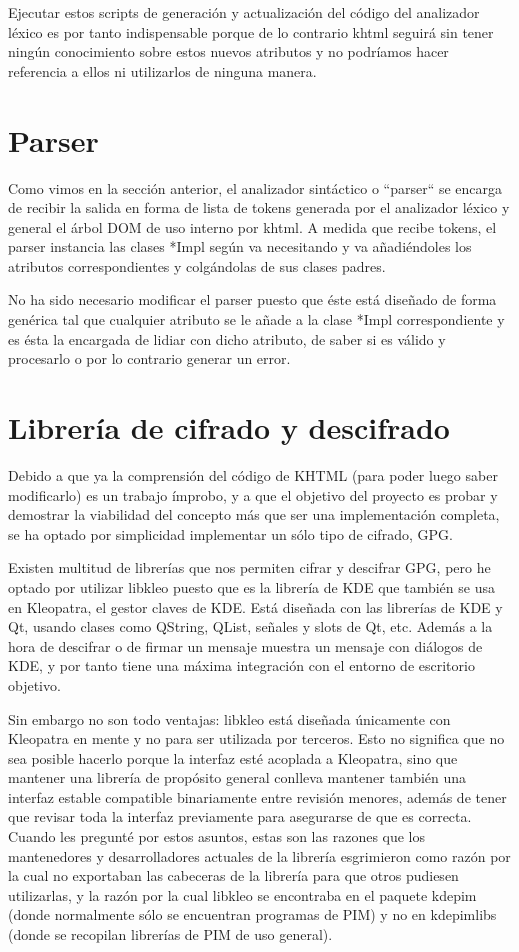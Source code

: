 Ejecutar estos scripts de generación y actualización del código del analizador léxico es por tanto indispensable porque de lo contrario khtml seguirá sin tener ningún conocimiento sobre estos nuevos atributos y no podríamos hacer referencia a ellos ni utilizarlos de ninguna manera.

\section{Parser}\label{khtml_patch_parser}

Como vimos en la sección anterior, el analizador sintáctico o ``parser`` se encarga de recibir la salida en forma de lista de tokens generada por el analizador léxico y general el árbol DOM de uso interno por khtml. A medida que recibe tokens, el parser instancia las clases *Impl según va necesitando y va añadiéndoles los atributos correspondientes y colgándolas de sus clases padres.

No ha sido necesario modificar el parser puesto que éste está diseñado de forma genérica tal que cualquier atributo se le añade a la clase *Impl correspondiente y es ésta la encargada de lidiar con dicho atributo, de saber si es válido y procesarlo o por lo contrario generar un error.

\section{Librería de cifrado y descifrado}\label{khtml_patch_parser}

Debido a que ya la comprensión del código de KHTML (para poder luego saber modificarlo) es un trabajo ímprobo, y a que el objetivo del proyecto es probar y demostrar la viabilidad del concepto más que ser una implementación completa, se ha optado por simplicidad implementar un sólo tipo de cifrado, GPG.

Existen multitud de librerías que nos permiten cifrar y descifrar GPG, pero he optado por utilizar libkleo puesto que es la librería de KDE que también se usa en Kleopatra, el gestor claves de KDE. Está diseñada con las librerías de KDE y Qt, usando clases como QString, QList, señales y slots de Qt, etc. Además a la hora de descifrar o de firmar un mensaje muestra un mensaje con diálogos de KDE, y por tanto tiene una máxima integración con el entorno de escritorio objetivo.

Sin embargo no son todo ventajas: libkleo está diseñada únicamente con Kleopatra en mente y no para ser utilizada por terceros. Esto no significa que no sea posible hacerlo porque la interfaz esté acoplada a Kleopatra, sino que mantener una librería de propósito general conlleva mantener también una interfaz estable compatible binariamente entre revisión menores, además de tener que revisar toda la interfaz previamente para asegurarse de que es correcta. Cuando les pregunté por estos asuntos, estas son las razones que los mantenedores y desarrolladores actuales de la librería esgrimieron como razón por la cual no exportaban las cabeceras de la librería para que otros pudiesen utilizarlas, y la razón por la cual libkleo se encontraba en el paquete kdepim (donde normalmente sólo se encuentran programas de PIM) y no en kdepimlibs (donde se recopilan librerías de PIM de uso general).

